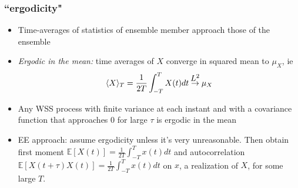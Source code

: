 \documentclass{beamer}
\newcommand\myeq{\stackrel{\mathclap{\normalfont\mbox{$L^2$}}}{\rightarrow}}
\begin{document}
\begin{frame}[fragile]
	\frametitle{``ergodicity"}
	\begin{itemize}
		\item Time-averages of statistics of ensemble member approach those of the ensemble
		\item \emph{Ergodic in the mean:} time averages of $X$ converge in squared mean to $\mu_X$, ie
			\begin{equation*}	
			\langle X \rangle_T = \frac{1}{2T} \int_{-T}^T X(t) dt \myeq \mu_X
			\end{equation*}
		\item Any WSS process with finite variance at each instant and with a covariance function that approaches 0 for large $\tau$ is ergodic in the mean
		\item EE approach: assume ergodicity unless it's very unreasonable. Then obtain first moment $\mathbb{E}[X(t)] = \frac{1}{2T} \int_{-T}^T x(t) dt$ and autocorrelation $\mathbb{E}[X(t+\tau)X(t)] = \frac{1}{2T} \int_{-T}^T x(t)dt$ on $x$, a realization of $X$, for some large $T$.

	\end{itemize}
\end{frame}
\end{document}

